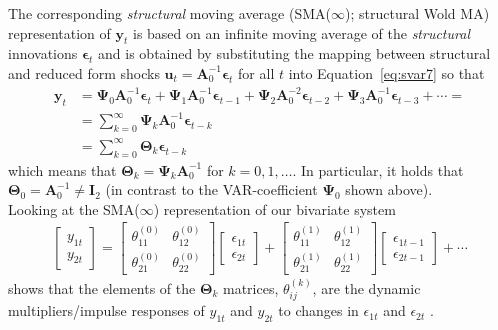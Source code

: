 \documentclass[a4paper,11pt,listof=nochaptergap,oneside,pointednumbers,bibtotoc,bigheadings,liststotoc,hidelinks]{scrbook}
\theoremstyle{mysatz}
\theoremstyle{mydefinition}
\theoremstyle{mytheorem}
\theoremstyle{mybemerkung}
\newcommand{\vect}[1]{\boldsymbol{\mathbf{#1}}}
\begin{document}
The corresponding \textit{structural} moving average (SMA($\infty$); structural Wold MA) representation of $\vect{y}_t$ is based on an infinite moving average of the \textit{structural} innovations $\vect{\epsilon}_t$ and is obtained by substituting the mapping between structural and reduced form shocks $\vect{u}_t = \vect{A}_0^{-1}\vect{\epsilon}_t$ \citep{zivot:00} for all $t$ into Equation~\ref{eq:svar7} so that
\begin{equation} \label{eq:svar8}
\begin{split}
 			\vect{y}_t & = \vect{\Psi}_0\vect{A}_0^{-1}\vect{\epsilon}_t + \vect{\Psi}_1\vect{A}_0^{-1}\vect{\epsilon}_{t-1} + \vect{\Psi}_{2}\vect{A}_0^{-2}\vect{\epsilon}_{t-2} + \vect{\Psi}_{3}\vect{A}_0^{-1}\vect{\epsilon}_{t-3} + \cdots = \\
			& = \sum\limits_{k=0}^\infty \vect{\Psi}_k\vect{A}_0^{-1}\vect{\epsilon}_{t-k} \\
			& = \sum\limits_{k=0}^\infty \vect{\Theta}_k\vect{\epsilon}_{t-k}
\end{split}								
\end{equation}
which means that $\vect{\Theta}_k = \vect{\Psi}_k\vect{A}_0^{-1}$ for $k = 0, 1, \dots$. In particular, it holds that $\vect{\Theta}_0=\vect{A}_0^{-1} \neq \vect{I}_2$ (in contrast to the VAR-coefficient $\vect{\Psi}_0$ shown above).\\

Looking at the SMA($\infty$) representation of our bivariate system 
\begin{equation} \label{eq:svar9}
\begin{split}
	\begin{bmatrix}
    	y_{1t} \\
    	y_{2t}
 	\end{bmatrix} 
	=
	\begin{bmatrix}
    	\theta_{11}^{(0)} & \theta_{12}^{(0)}\\
    	\theta_{21}^{(0)} & \theta_{22}^{(0)}
 	\end{bmatrix} 
	\begin{bmatrix}
    	\epsilon_{1t} \\
	\epsilon_{2t}
 	\end{bmatrix} + 
	\begin{bmatrix}
    	\theta_{11}^{(1)} & \theta_{12}^{(1)}\\
    	\theta_{21}^{(1)} & \theta_{22}^{(1)}
 	\end{bmatrix} 
	\begin{bmatrix}
    	\epsilon_{1t-1} \\
	\epsilon_{2t-1}
 	\end{bmatrix} + \cdots 
\end{split}								
\end{equation}
shows that the elements of the $\vect{\Theta}_k$ matrices, $\theta_{ij}^{(k)}$, are the dynamic multipliers/impulse responses of $y_{1t}$ and $y_{2t}$ to changes in $\epsilon_{1t}$ and $\epsilon_{2t}$ \citep{zivot:00}.\\
\end{document}
